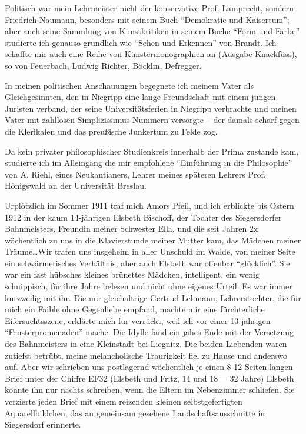 Politisch war mein Lehrmeister nicht der konservative Prof. Lamprecht, sondern Friedrich Naumann, besonders mit seinem Buch \enquote{Demokratie und Kaisertum}; aber auch seine Sammlung von Kunstkritiken in seinem Buche \enquote{Form und Farbe} studierte ich genauso gründlich wie \enquote{Sehen und Erkennen} von Brandt. Ich schaffte mir auch eine Reihe von Künstermonographien an (Ausgabe Knackfüss), so von Feuerbach, Ludwig Richter, Böcklin, Defregger.

In meinen politischen Anschauungen begegnete ich meinem Vater als Gleichgesinnten, den in Niegripp eine lange Freundschaft mit einem jungen Juristen verband, der seine Universitätsferien in Niegripp verbrachte und meinen Vater mit zahllosen Simplizissimus-Nummern versorgte -- der damals scharf gegen die Klerikalen und das preußische Junkertum zu Felde zog.

Da kein privater philosophischer Studienkreis innerhalb der Prima zustande kam, studierte ich im Alleingang die mir empfohlene \enquote{Einführung in die Philosophie} von A. Riehl, eines Neukantianers, Lehrer meines späteren Lehrers Prof. Hönigswald an der Universität Breslau. 

Urplötzlich im Sommer 1911 traf mich Amors Pfeil, und ich erblickte bis Ostern 1912 in der kaum 14-jährigen Elsbeth Bischoff, der Tochter des Siegersdorfer Bahnmeisters, Freundin meiner Schwester Ella, und die seit Jahren 2x wöchentlich zu uns in die Klavierstunde meiner Mutter kam, das Mädchen meiner Träume\dots Wir trafen uns insgeheim in aller Unschuld im Walde, von meiner Seite ein schwärmerisches Verhältnis, aber auch Elsbeth war offenbar \enquote{glücklich}. Sie war ein fast hübsches kleines brünettes Mädchen, intelligent, ein wenig schnippisch, für ihre Jahre belesen und nicht ohne eigenes Urteil. Es war immer kurzweilig mit ihr. Die mir gleichaltrige Gertrud Lehmann, Lehrerstochter, die für mich ein Faible ohne Gegenliebe empfand, machte mir eine fürchterliche Eifersuchtsszene, erklärte mich für verrückt, weil ich vor einer 13-jährigen \enquote{Fensterpromenaden} mache. Die Idylle fand ein jähes Ende mit der Versetzung des Bahnmeisters in eine Kleinstadt bei Liegnitz. Die beiden Liebenden waren zutiefst betrübt, meine melancholische Traurigkeit fiel zu Hause und anderswo auf. Aber wir schrieben uns postlagernd wöchentlich je einen 8-12 Seiten langen Brief unter der Chiffre EF32 (Elsbeth und Fritz, 14 und 18 = 32 Jahre) Elsbeth konnte ihn nur nachts schreiben, wenn die Eltern im Nebenzimmer schliefen. Sie verzierte jeden Brief mit einem reizenden kleinen selbstgefertigten Aquarellbildchen, das an gemeinsam gesehene Landschaftsausschnitte in Siegersdorf erinnerte.

